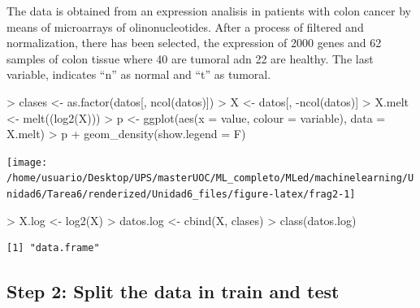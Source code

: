 \documentclass[
]{article}
\newenvironment{Shaded}{\begin{snugshade}}{\end{snugshade}}
\newcommand{\AttributeTok}[1]{\textcolor[rgb]{0.80,0.80,0.80}{#1}}
\newcommand{\FunctionTok}[1]{\textcolor[rgb]{0.94,0.94,0.56}{#1}}
\newcommand{\NormalTok}[1]{\textcolor[rgb]{0.80,0.80,0.80}{#1}}
\newcommand{\OtherTok}[1]{\textcolor[rgb]{0.94,0.94,0.56}{#1}}
\newcommand{\SpecialCharTok}[1]{\textcolor[rgb]{0.86,0.64,0.64}{#1}}
\begin{document}
The data is obtained from an expression analisis in patients with colon
cancer by means of microarrays of olinonucleotides. After a process of
filtered and normalization, there has been selected, the expression of
2000 genes and 62 samples of colon tissue where 40 are tumoral adn 22
are healthy. The last variable, indicates ``n'' as normal and ``t'' as
tumoral.

\begin{Shaded}
\begin{Highlighting}[]
\SpecialCharTok{\textgreater{}}\NormalTok{ clases }\OtherTok{\textless{}{-}} \FunctionTok{as.factor}\NormalTok{(datos[, }\FunctionTok{ncol}\NormalTok{(datos)])}
\SpecialCharTok{\textgreater{}}\NormalTok{ X }\OtherTok{\textless{}{-}}\NormalTok{ datos[, }\SpecialCharTok{{-}}\FunctionTok{ncol}\NormalTok{(datos)]}
\SpecialCharTok{\textgreater{}}\NormalTok{ X.melt }\OtherTok{\textless{}{-}} \FunctionTok{melt}\NormalTok{((}\FunctionTok{log2}\NormalTok{(X)))}
\SpecialCharTok{\textgreater{}}\NormalTok{ p }\OtherTok{\textless{}{-}} \FunctionTok{ggplot}\NormalTok{(}\FunctionTok{aes}\NormalTok{(}\AttributeTok{x =}\NormalTok{ value, }\AttributeTok{colour =}\NormalTok{ variable), }\AttributeTok{data =}\NormalTok{ X.melt)}
\SpecialCharTok{\textgreater{}}\NormalTok{ p }\SpecialCharTok{+} \FunctionTok{geom\_density}\NormalTok{(}\AttributeTok{show.legend =}\NormalTok{ F)}
\end{Highlighting}
\end{Shaded}

\begin{center}\texttt{[image: /home/usuario/Desktop/UPS/masterUOC/ML\_completo/MLed/machinelearning/Unidad6/Tarea6/renderized/Unidad6\_files/figure-latex/frag2-1]} \end{center}

\begin{Shaded}
\begin{Highlighting}[]
\SpecialCharTok{\textgreater{}}\NormalTok{ X.log }\OtherTok{\textless{}{-}} \FunctionTok{log2}\NormalTok{(X)}
\SpecialCharTok{\textgreater{}}\NormalTok{ datos.log }\OtherTok{\textless{}{-}} \FunctionTok{cbind}\NormalTok{(X, clases)}
\SpecialCharTok{\textgreater{}} \FunctionTok{class}\NormalTok{(datos.log)}
\end{Highlighting}
\end{Shaded}

\begin{verbatim}
[1] "data.frame"
\end{verbatim}

\hypertarget{step-2-split-the-data-in-train-and-test}{%
\subsection{Step 2: Split the data in train and
test}\label{step-2-split-the-data-in-train-and-test}}
\end{document}
